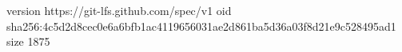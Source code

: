 version https://git-lfs.github.com/spec/v1
oid sha256:4c5d2d8cec0e6a6bfb1ac4119656031ae2d861ba5d36a03f8d21e9c528495ad1
size 1875
